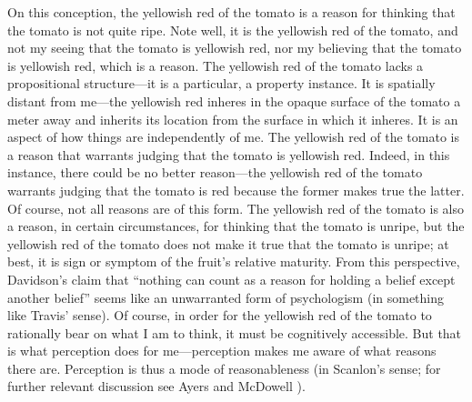 \documentclass[12pt]{article}
\begin{document}
On this conception, the yellowish red of the tomato is a reason for thinking that the tomato is not quite ripe. Note well, it is the yellowish red of the tomato, and not my seeing that the tomato is yellowish red, nor my believing that the tomato is yellowish red, which is a reason. The yellowish red of the tomato lacks a propositional structure---it is a particular, a property instance. It is spatially distant from me---the yellowish red inheres in the opaque surface of the tomato a meter away and inherits its location from the surface in which it inheres. It is an aspect of how things are independently of me. The yellowish red of the tomato is a reason that warrants judging that the tomato is yellowish red. Indeed, in this instance, there could be no better reason---the yellowish red of the tomato warrants judging that the tomato is red because the former makes true the latter. Of course, not all reasons are of this form. The yellowish red of the tomato is also a reason, in certain circumstances, for thinking that the tomato is unripe, but the yellowish red of the tomato does not make it true that the tomato is unripe; at best, it is sign or symptom of the fruit's relative maturity. From this perspective, Davidson's \citeyearpar[310]{Davidson:1986uq} claim that ``nothing can count as a reason for holding a belief except another belief'' seems like an unwarranted form of psychologism (in something like Travis' \citeyear{Travis:2006fk} sense). Of course, in order for the yellowish red of the tomato to rationally bear on what I am to think, it must be cognitively accessible. But that is what perception does for me---perception makes me aware of what reasons there are. Perception is thus a mode of reasonableness (in Scanlon's \citeyear[]{Scanlon:1998hb} sense; for further relevant discussion see Ayers \citeyear{Ayers:2004kx} and McDowell \citeyear{McDowell:2006vn}).
\end{document}
